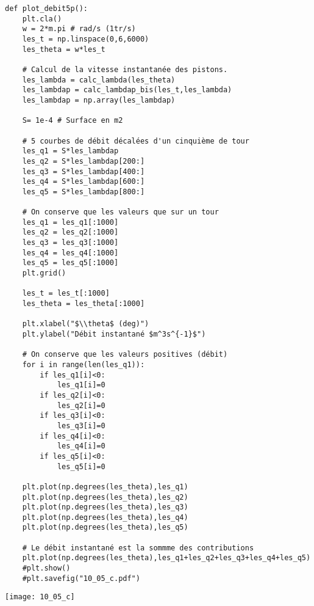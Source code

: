 \ifprof
\begin{lstlisting}
def plot_debit5p():
    plt.cla()
    w = 2*m.pi # rad/s (1tr/s)
    les_t = np.linspace(0,6,6000)
    les_theta = w*les_t
   
    # Calcul de la vitesse instantanée des pistons.
    les_lambda = calc_lambda(les_theta)
    les_lambdap = calc_lambdap_bis(les_t,les_lambda)
    les_lambdap = np.array(les_lambdap)
    
    S= 1e-4 # Surface en m2
    
    # 5 courbes de débit décalées d'un cinquième de tour
    les_q1 = S*les_lambdap
    les_q2 = S*les_lambdap[200:]
    les_q3 = S*les_lambdap[400:]
    les_q4 = S*les_lambdap[600:]
    les_q5 = S*les_lambdap[800:]
    
    # On conserve que les valeurs que sur un tour
    les_q1 = les_q1[:1000]
    les_q2 = les_q2[:1000]
    les_q3 = les_q3[:1000]
    les_q4 = les_q4[:1000]
    les_q5 = les_q5[:1000]
    plt.grid()
    
    les_t = les_t[:1000]
    les_theta = les_theta[:1000]
  
    plt.xlabel("$\\theta$ (deg)")
    plt.ylabel("Débit instantané $m^3s^{-1}$")
    
    # On conserve que les valeurs positives (débit)
    for i in range(len(les_q1)):
        if les_q1[i]<0:
            les_q1[i]=0
        if les_q2[i]<0:
            les_q2[i]=0
        if les_q3[i]<0:
            les_q3[i]=0
        if les_q4[i]<0:
            les_q4[i]=0
        if les_q5[i]<0:
            les_q5[i]=0

    plt.plot(np.degrees(les_theta),les_q1)
    plt.plot(np.degrees(les_theta),les_q2)
    plt.plot(np.degrees(les_theta),les_q3)
    plt.plot(np.degrees(les_theta),les_q4)
    plt.plot(np.degrees(les_theta),les_q5)
    
    # Le débit instantané est la sommme des contributions
    plt.plot(np.degrees(les_theta),les_q1+les_q2+les_q3+les_q4+les_q5)
    #plt.show() 
    #plt.savefig("10_05_c.pdf")
\end{lstlisting}

\begin{center}
\texttt{[image: 10\_05\_c]}
\end{center}
\else
\fi


